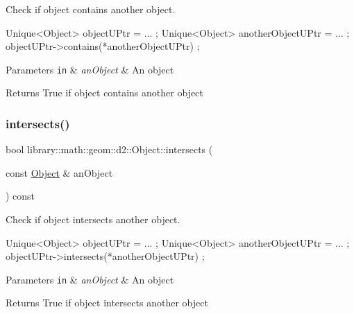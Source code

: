 Check if object contains another object. 


\begin{DoxyCode}
Unique<Object> objectUPtr = ... ;
Unique<Object> anotherObjectUPtr = ... ;
objectUPtr->contains(*anotherObjectUPtr) ;
\end{DoxyCode}



\begin{DoxyParams}[1]{Parameters}
\mbox{\tt in}  & {\em an\+Object} & An object \\
\hline
\end{DoxyParams}
\begin{DoxyReturn}{Returns}
True if object contains another object 
\end{DoxyReturn}
\mbox{\label{classlibrary_1_1math_1_1geom_1_1d2_1_1_object_a22819b510e52283c19c4ed947e0cba97}} 
\subsubsection{\texorpdfstring{intersects()}{intersects()}}
{\footnotesize\ttfamily bool library\+::math\+::geom\+::d2\+::\+Object\+::intersects (\begin{DoxyParamCaption}\item[{const \hyperlink{classlibrary_1_1math_1_1geom_1_1d2_1_1_object}{Object} \&}]{an\+Object }\end{DoxyParamCaption}) const\hspace{0.3cm}{\ttfamily [virtual]}}



Check if object intersects another object. 


\begin{DoxyCode}
Unique<Object> objectUPtr = ... ;
Unique<Object> anotherObjectUPtr = ... ;
objectUPtr->intersects(*anotherObjectUPtr) ;
\end{DoxyCode}



\begin{DoxyParams}[1]{Parameters}
\mbox{\tt in}  & {\em an\+Object} & An object \\
\hline
\end{DoxyParams}
\begin{DoxyReturn}{Returns}
True if object intersects another object 
\end{DoxyReturn}
\mbox{\label{classlibrary_1_1math_1_1geom_1_1d2_1_1_object_ae9506254971168a3ca63e1923556b70d}} 
